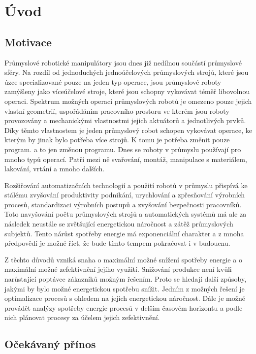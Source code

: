 

\chapter{Úvod}

\section{Motivace}

Průmyslové robotické manipulátory jsou dnes již nedílnou součástí průmyslové sféry. Na rozdíl od jednoduchých jednoúčelových průmyslových strojů, které jsou úzce specializované pouze na jeden typ operace, jsou průmyslové roboty zamýšleny jako víceúčelové stroje, které jsou schopny vykovávat téměř libovolnou operaci. Spektrum možných operací průmyslových robotů je omezeno pouze jejich vlastní geometrií, uspořádáním pracovního prostoru ve kterém jsou roboty provozovány a mechanickými vlastnostmi jejich aktuátorů a jednotlivých prvků. Díky těmto vlastnostem je jeden průmyslový robot schopen vykovávat operace, ke kterým by jinak bylo potřeba více strojů. K tomu je potřeba změnit pouze program. a to jen změnou programu. Dnes se roboty v průmyslu používají pro mnoho typů operací. Patří mezi ně svařování, montáž, manipulace s materiálem, lakování, vrtání a mnoho dalších.

Rozšiřování automatizačních technologií a použití robotů v průmyslu přispívá ke stálému zvyšování produktivity podnikání, urychlování a zpřesňování výrobních procesů, standardizaci výrobních postupů a zvyšování bezpečnosti pracovníků. Toto navyšování počtu průmyslových strojů a automatických systémů má ale za následek neustále se zvětšující energetickou náročnost a zátěž průmyslových subjektů. Tento nárůst spotřeby energie má exponenciální charakter a z mnoha předpovědí \cite{energy_url} je možné říct, že bude tímto tempem pokračovat i v budoucnu.

Z těchto důvodů vzniká snaha o maximální možné snížení spotřeby energie a o maximální možné zefektivnění jejího využití. Snižování produkce není kvůli narůstající poptávce zákazníků možným řešením. Proto se hledají další způsoby, jakými by bylo možné energetickou spotřebu snížit. Jedním z možných řešení je optimalizace procesů s ohledem na jejich energetickou náročnost. Dále je možné provádět analýzy spotřeby energie procesů v delším časovém horizontu a podle nich plánovat procesy za účelem jejich zefektivnění.

\section{Očekávaný přínos}

